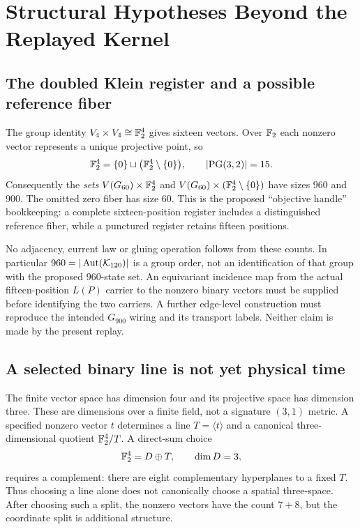 \section{Structural Hypotheses Beyond the Replayed Kernel}\label{app:horizon}
\subsection{The doubled Klein register and a possible reference fiber}
The group identity $V_4\times V_4\cong\mathbb F_2^4$ gives sixteen vectors. Over $\mathbb F_2$ each nonzero vector represents a unique projective point, so
\[
\mathbb F_2^4=\{0\}\sqcup\bigl(\mathbb F_2^4\setminus\{0\}\bigr),
\qquad |\mathrm{PG}(3,2)|=15.
\]
Consequently the \emph{sets} $V(G_{60})\times\mathbb F_2^4$ and $V(G_{60})\times(\mathbb F_2^4\setminus\{0\})$ have sizes $960$ and $900$. The omitted zero fiber has size $60$. This is the proposed ``objective handle'' bookkeeping: a complete sixteen-position register includes a distinguished reference fiber, while a punctured register retains fifteen positions.

No adjacency, current law or gluing operation follows from these counts. In particular $960=|\operatorname{Aut}(\mathcal K_{120})|$ is a group order, not an identification of that group with the proposed $960$-state set. An equivariant incidence map from the actual fifteen-position $L(P)$ carrier to the nonzero binary vectors must be supplied before identifying the two carriers. A further edge-level construction must reproduce the intended $G_{900}$ wiring and its transport labels. Neither claim is made by the present replay.

\subsection{A selected binary line is not yet physical time}
The finite vector space has dimension four and its projective space has dimension three. These are dimensions over a finite field, not a signature $(3,1)$ metric. A specified nonzero vector $t$ determines a line $T=\langle t\rangle$ and a canonical three-dimensional quotient $\mathbb F_2^4/T$. A direct-sum choice
\[
\mathbb F_2^4=D\oplus T,\qquad \dim D=3,
\]
requires a complement: there are eight complementary hyperplanes to a fixed $T$. Thus choosing a line alone does not canonically choose a spatial three-space. After choosing such a split, the nonzero vectors have the count $7+8$, but the coordinate split is additional structure.

